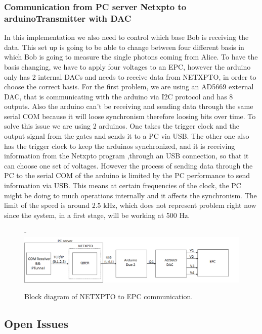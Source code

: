 \begin{refsection}
	\subsubsection{Communication from PC server Netxpto to arduinoTransmitter with DAC}
	In this implementation we also need to control which base Bob is receiving the data. This set up is going to be able to change between four different basis in which Bob is going to measure the single photons coming from Alice. To have the basis changing, we have to apply four voltages to an EPC, however the arduino only has 2 internal DACs and needs to receive data from NETXPTO, in order to choose the correct basis. For the first problem, we are using an AD5669 external DAC, that is communicating with the arduino via I2C protocol and has 8 outputs. Also the arduino can't be receiving and sending data through the same serial COM because it will loose synchronism therefore loosing bits over time. To solve this issue we are using 2 arduinos. One takes the trigger clock and the output signal from the gates and sends it to a PC via USB. The other one also has the trigger clock to keep the arduinos synchronized, and it is receiving information from the Netxpto program ,through an USB connection, so that it can choose one set of voltages. However the process of sending data through the PC to the serial COM of the arduino is limited by the PC performance to send information via USB. This means at certain frequencies of the clock, the PC might be doing to much operations internally and it affects the synchronism. The limit of the speed is around 2.5 kHz, which does not represent problem right now since the system, in a first stage, will be working at 500 Hz. 
			
	\begin{figure}[H]
		\centering-
		\includegraphics[width=1\linewidth]{./sdf/arduino_quantum_rx/figures/DAC.png}
		\caption{Block diagram of NETXPTO to EPC communication.}
		\label{fig:netxpto}

	\end{figure}
	\subsection{Open Issues}
	

\end{refsection}
